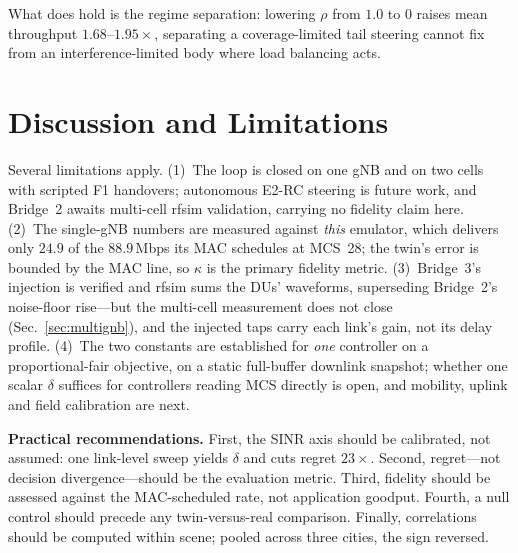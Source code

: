 \documentclass[conference]{IEEEtran}
\begin{document}
What does hold is the regime separation: lowering $\rho$ from $1.0$ to $0$ raises mean throughput $1.68$--$1.95\times$, separating a coverage-limited tail steering cannot fix from an interference-limited body where load balancing acts.

\section{Discussion and Limitations}
\label{sec:disc}
Several limitations apply. (1)~The loop is closed on one gNB and on two cells with scripted F1 handovers; autonomous E2-RC steering is future work, and Bridge~2 awaits multi-cell rfsim validation, carrying no fidelity claim here. (2)~The single-gNB numbers are measured against \emph{this} emulator, which delivers only $24.9$ of the $88.9$\,Mbps its MAC schedules at MCS~28; the twin's error is bounded by the MAC line, so $\kappa$ is the primary fidelity metric. (3)~Bridge~3's injection is verified and rfsim sums the DUs' waveforms, superseding Bridge~2's noise-floor rise---but the multi-cell measurement does not close (Sec.~\ref{sec:multignb}), and the injected taps carry each link's gain, not its delay profile. (4)~The two constants are established for \emph{one} controller on a proportional-fair objective, on a static full-buffer downlink snapshot; whether one scalar $\delta$ suffices for controllers reading MCS directly is open, and mobility, uplink and field calibration are next.

\textbf{Practical recommendations.} First, the SINR axis should be calibrated, not assumed: one link-level sweep yields $\delta$ and cuts regret $23\times$. Second, regret---not decision divergence---should be the evaluation metric. Third, fidelity should be assessed against the MAC-scheduled rate, not application goodput. Fourth, a null control should precede any twin-versus-real comparison. Finally, correlations should be computed within scene; pooled across three cities, the sign reversed.

\end{document}
